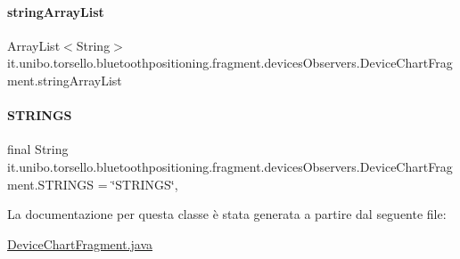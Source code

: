 \paragraph{\texorpdfstring{string\+Array\+List}{stringArrayList}}
{\footnotesize\ttfamily Array\+List$<$String$>$ it.\+unibo.\+torsello.\+bluetoothpositioning.\+fragment.\+devices\+Observers.\+Device\+Chart\+Fragment.\+string\+Array\+List\hspace{0.3cm}{\ttfamily [private]}}

\hypertarget{classit_1_1unibo_1_1torsello_1_1bluetoothpositioning_1_1fragment_1_1devicesObservers_1_1DeviceChartFragment_a343835bbfb305e22881397c1b9249b00_a343835bbfb305e22881397c1b9249b00}{}\label{classit_1_1unibo_1_1torsello_1_1bluetoothpositioning_1_1fragment_1_1devicesObservers_1_1DeviceChartFragment_a343835bbfb305e22881397c1b9249b00_a343835bbfb305e22881397c1b9249b00} 
\paragraph{\texorpdfstring{S\+T\+R\+I\+N\+GS}{STRINGS}}
{\footnotesize\ttfamily final String it.\+unibo.\+torsello.\+bluetoothpositioning.\+fragment.\+devices\+Observers.\+Device\+Chart\+Fragment.\+S\+T\+R\+I\+N\+GS = \char`\"{}S\+T\+R\+I\+N\+GS\char`\"{}\hspace{0.3cm}{\ttfamily [static]}, {\ttfamily [private]}}



La documentazione per questa classe è stata generata a partire dal seguente file\+:\begin{DoxyCompactItemize}
\item 
\hyperlink{DeviceChartFragment_8java}{Device\+Chart\+Fragment.\+java}\end{DoxyCompactItemize}

